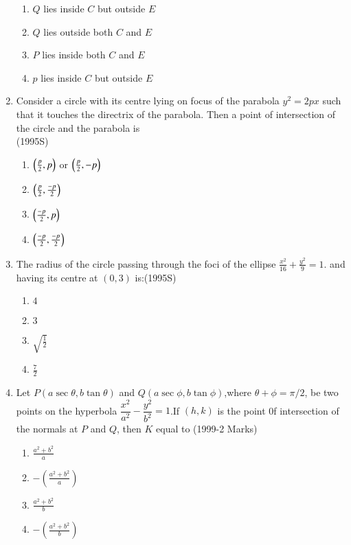 \documentclass[journal,12pt,twocolumn]{IEEEtran}
\theoremstyle{remark}
\begin{document}
\begin{enumerate}
\begin{enumerate}
    \item $Q$ lies inside $C$ but outside $E$
    \item $Q$ lies outside both $C$ and $E$
    \item $P$ lies inside both $C$ and $E$
    \item $p$ lies inside $C$ but outside $E$ \\
\end{enumerate}
\item Consider a circle with its centre lying on focus of the parabola $y^2=2px$ such that it touches the directrix of the parabola. Then a point of intersection of the circle and the parabola is\\\hfill(1995S)\\
\begin{enumerate}
    \item $\left(\frac{p}{2},p\right)$ or $\left(\frac{p}{2},-p\right)$
    \item $\left(\frac{p}{2},\frac{-p}{2}\right)$
    \item $\left(\frac{-p}{2},p\right)$
    \item $\left(\frac{-p}{2},\frac{-p}{2}\right)$
\end{enumerate}
\item The radius of the circle passing through the foci of the ellipse $\frac{x^2}{16}+\frac{y^2}{9}=1$. and having its centre at $(0,3)$ is:\hfill (1995S)\\
\begin{enumerate}
    \item $4$
    \item $3$
    \item $\sqrt{\frac{1}{2}}$
    \item $\frac{7}{2}$\\
\end{enumerate}
\item Let $P(a\sec\theta,b\tan\theta)$ and $Q(a\sec\phi,b\tan \phi)$,where $\theta+\phi=\pi/2$, be two points on the hyperbola $\dfrac{x^2}{a^2}-\dfrac{y^2}{b^2}=1$.If $(h,k)$ is the point 0f intersection of the normals at $P$ and $Q$, then $K$ equal to \hfill (1999-2 Marks)
\begin{enumerate}
    \item $\frac{a^2+b^2}{a}$
    \item $-(\frac{a^2+b^2}{a})$
    \item $\frac{a^2+b^2}{b}$
    \item $-(\frac{a^2+b^2}{b})$
\end{enumerate}

\end{enumerate}
\end{document}
